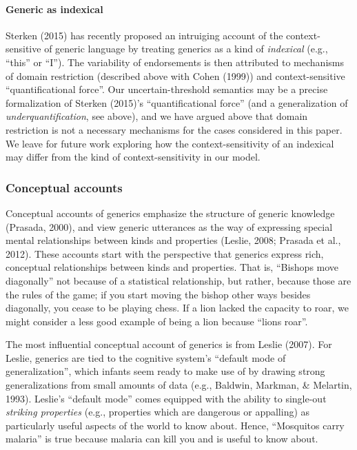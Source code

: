 \documentclass[english,floatsintext,man]{apa6}
\theoremstyle{definition}
\theoremstyle{definition}
\theoremstyle{definition}
\theoremstyle{remark}
\begin{document}
\paragraph{Generic as indexical}\label{generic-as-indexical}

Sterken (2015) has recently proposed an intruiging account of the
context-sensitive of generic language by treating generics as a kind of
\emph{indexical} (e.g., \enquote{this} or \enquote{I}). The variability
of endorsements is then attributed to mechanisms of domain restriction
(described above with Cohen (1999)) and context-sensitive
\enquote{quantificational force}. Our uncertain-threshold semantics may
be a precise formalization of Sterken (2015)'s \enquote{quantificational
force} (and a generalization of \emph{underquantification}, see above),
and we have argued above that domain restriction is not a necessary
mechanisms for the cases considered in this paper. We leave for future
work exploring how the context-sensitivity of an indexical may differ
from the kind of context-sensitivity in our model.

\subsubsection{Conceptual accounts}\label{conceptual-accounts}

Conceptual accounts of generics emphasize the structure of generic
knowledge (Prasada, 2000), and view generic utterances as the way of
expressing special mental relationships between kinds and properties
(Leslie, 2008; Prasada et al., 2012). These accounts start with the
perspective that generics express rich, conceptual relationships between
kinds and properties. That is, \enquote{Bishops move diagonally} not
because of a statistical relationship, but rather, because those are the
rules of the game; if you start moving the bishop other ways besides
diagonally, you cease to be playing chess. If a lion lacked the capacity
to roar, we might consider a less good example of being a lion because
\enquote{lions roar}.

The most influential conceptual account of generics is from Leslie
(2007). For Leslie, generics are tied to the cognitive system's
\enquote{default mode of generalization}, which infants seem ready to
make use of by drawing strong generalizations from small amounts of data
(e.g., Baldwin, Markman, \& Melartin, 1993). Leslie's \enquote{default
mode} comes equipped with the ability to single-out
\emph{striking properties} (e.g., properties which are dangerous or
appalling) as particularly useful aspects of the world to know about.
Hence, \enquote{Mosquitos carry malaria} is true because malaria can
kill you and is useful to know about.
\end{document}
